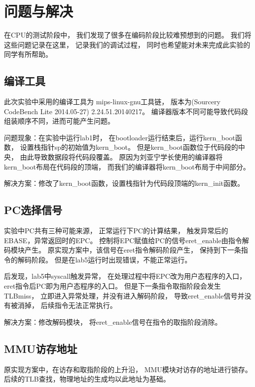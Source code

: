 \section{问题与解决}
    在CPU的测试阶段中，
    我们发现了很多在编码阶段比较难预想到的问题。
    我们将这些问题记录在这里，
    记录我们的调试过程，
    同时也希望能对未来完成此实验的同学有所帮助。

    \subsection{编译工具}
        此次实验中采用的编译工具为
        mips-linux-gnu工具链，
        版本为(Sourcery CodeBench Lite 2014.05-27)
        2.24.51.20140217。
        编译器版本不同可能导致代码段组装顺序不同，进而可能产生问题。

        问题现象：在实验中运行lab1时，
        在bootloader运行结束后，运行kern\_boot函数，
        设置栈指针sp的初始值为kern\_boot。
        但是kern\_boot函数位于代码段的中央，
        由此导致数据段将代码段覆盖。
        原因为刘亚宁学长使用的编译器将kern\_boot布局在代码段的顶端，
        而我们的编译器将kern\_boot布局于中间部分。

        解决方案：修改了kern\_boot函数，设置栈指针为代码段顶端的kern\_init函数。

    \subsection{PC选择信号}
        实验中PC共有三种可能来源，
        正常运行下PC的计算结果，
        触发异常后的EBASE，异常返回时的EPC。
        控制将EPC赋值给PC的信号eret\_enable由指令解码模块产生。
        原实现方案中，该信号在eret指令解码阶段产生，
        保持到下一条指令的解码阶段。
        但是在lab5运行时出现错误，不能正常运行。

        后发现，lab5中syscall触发异常，
        在处理过程中将EPC改为用户态程序的入口，
        eret指令后PC即为用户态程序的入口。
        但是下一条指令取指阶段会发生TLBmiss，
        立即进入异常处理，并没有进入解码阶段，
        导致eret\_enable信号并没有被消掉，
        后续指令无法正常执行。

        解决方案：修改解码模块，
        将eret\_enable信号在指令的取指阶段消除。

    \subsection{MMU访存地址}
        原实现方案中，在访存和取指阶段的上升沿，
        MMU模块对访存的地址进行锁存。
        后续的TLB查找，物理地址的生成均以此地址为基础。

